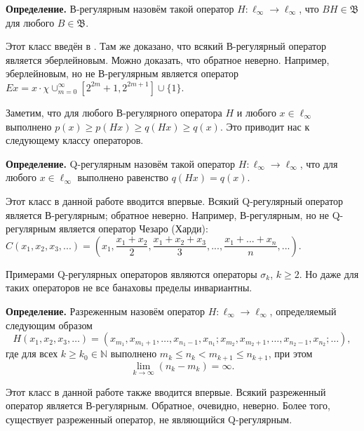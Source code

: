 \documentclass[a4paper,14pt]{article}
\begin{document}
	\textbf{Определение.}
	В-регулярным назовём такой оператор $H:\ell_\infty \to \ell_\infty$,
	что $B H \in \mathfrak B$ для любого $B\in \mathfrak B$.

	Этот класс введён в
	\cite{alekhno2018invariant}.
	Там же доказано, что всякий В-регулярный оператор является эберлейновым.
	Можно доказать, что обратное неверно.
	Например, эберлейновым, но не В-регулярным является оператор
	$
	Ex = x \cdot \chi {\cup_{m=0}^{\infty}\left[2^{2 m}+1, 2^{2 m+1}\right] \cup\{1\}}
	$.

	Заметим, что для любого В-регулярного оператора $H$ и любого $x\in \ell_\infty$ выполнено
	$p(x) \geq p(Hx) \geq q(Hx) \geq q(x)$.
	Это приводит нас к следующему классу операторов.

	\textbf{Определение.} Q-регулярным назовём такой оператор $H:\ell_\infty\to \ell_\infty$,
	что для любого $x\in\ell_\infty$ выполнено равенство $q(Hx) = q(x)$.


	Этот класс в данной работе вводится впервые.
	Всякий Q-регулярный оператор является В-регулярным;
	обратное неверно.
	Например, В-регулярным, но не Q-регулярным является оператор Чезаро (Харди):
	$
	C (x_1, x_2, x_3, ...) = \left(
	x_1,
	\dfrac{x_1+x_2}2,
	\dfrac{x_1+x_2 + x_3}3,
	...,
	\dfrac{x_1+...+x_n}n,
	...\right)
	.
	$


	Примерами Q-регулярных операторов являются операторы $\sigma_k$, $k\ge 2$.
	Но даже для таких операторов не все банаховы пределы инвариантны.

	\textbf{Определение.}
	Разреженным назовём оператор $H: \ell_\infty \to \ell_\infty$,
	определяемый следующим образом
	$$
	H(x_1, x_2, x_3, \ldots) = (x_{m_1}, x_{m_1 + 1}, \ldots, x_{n_1 - 1}, x_{n_1};
	x_{m_2}, x_{m_2 + 1}, \ldots, x_{n_2 - 1}, x_{n_2}; \ldots),
	$$
	где для всех
	$k \geqslant k_0 \in \mathbb N$
	выполнено
	$
	m_k \leqslant n_k < m_{k+1}\leqslant n_{k+1}
	$,
	при этом
	$$
	\lim\limits_{k \to \infty} (n_k - m_k) = \infty
	.
	$$

	Этот класс в данной работе также вводится впервые.
	Всякий разреженный оператор является В-регулярным.
	Обратное, очевидно, неверно.
	Более того, существует разреженный оператор, не являющийся Q-регулярным.


	\setcounter{equation}{0}
	\setcounter{figure}{0}
\end{document}
